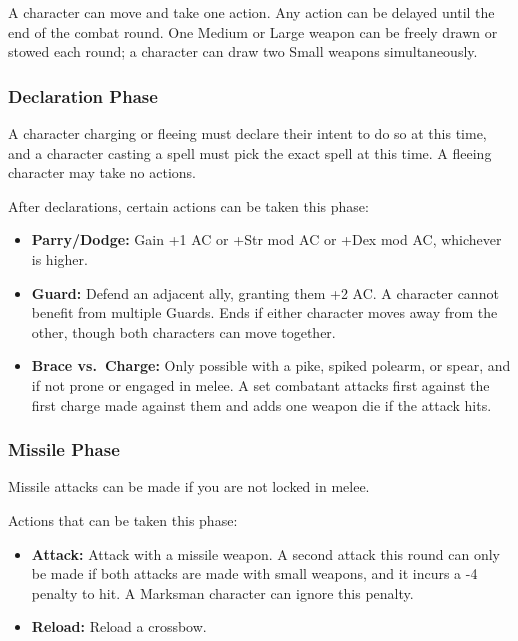 \documentclass{book}
\providecommand{\tightlist}{%
\setlength{\itemsep}{0pt}\setlength{\parskip}{0pt}}
\begin{document}
A character can move and take one action. Any action can be delayed
until the end of the combat round. One Medium or Large weapon can be
freely drawn or stowed each round; a character can draw two Small
weapons simultaneously.

\subsubsection*{Declaration Phase}\label{declaration-phase}

A character charging or fleeing must declare their intent to do so at
this time, and a character casting a spell must pick the exact spell at
this time. A fleeing character may take no actions.

After declarations, certain actions can be taken this phase:

\begin{itemize}
\tightlist
\item
  \textbf{Parry/Dodge:} Gain +1 AC or +Str mod AC or +Dex mod AC,
  whichever is higher.
\item
  \textbf{Guard:} Defend an adjacent ally, granting them +2 AC. A
  character cannot benefit from multiple Guards. Ends if either
  character moves away from the other, though both characters can move
  together.
\item
  \textbf{Brace vs.~Charge:} Only possible with a pike, spiked polearm,
  or spear, and if not prone or engaged in melee. A set combatant
  attacks first against the first charge made against them and adds one
  weapon die if the attack hits.
\end{itemize}

\subsubsection*{Missile Phase}\label{missile-phase}

Missile attacks can be made if you are not locked in melee.

Actions that can be taken this phase:

\begin{itemize}
\tightlist
\item
  \textbf{Attack:} Attack with a missile weapon. A second attack this
  round can only be made if both attacks are made with small weapons,
  and it incurs a -4 penalty to hit. A Marksman character can ignore
  this penalty.
\item
  \textbf{Reload:} Reload a crossbow.
\end{itemize}
\end{document}
